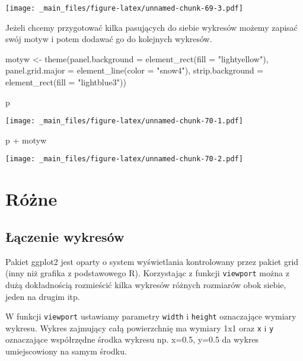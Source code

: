 \documentclass[
]{book}
\newenvironment{Shaded}{\begin{snugshade}}{\end{snugshade}}
\newcommand{\AttributeTok}[1]{\textcolor[rgb]{0.77,0.63,0.00}{#1}}
\newcommand{\FunctionTok}[1]{\textcolor[rgb]{0.00,0.00,0.00}{#1}}
\newcommand{\NormalTok}[1]{#1}
\newcommand{\OtherTok}[1]{\textcolor[rgb]{0.56,0.35,0.01}{#1}}
\newcommand{\SpecialCharTok}[1]{\textcolor[rgb]{0.00,0.00,0.00}{#1}}
\newcommand{\StringTok}[1]{\textcolor[rgb]{0.31,0.60,0.02}{#1}}
\begin{document}
\texttt{[image: \_main\_files/figure-latex/unnamed-chunk-69-3.pdf]}

Jeżeli chcemy przygotować kilka pasujących do siebie wykresów możemy zapisać swój motyw i potem dodawać go do kolejnych wykresów.

\begin{Shaded}
\begin{Highlighting}[]
\NormalTok{motyw }\OtherTok{\textless{}{-}} \FunctionTok{theme}\NormalTok{(}\AttributeTok{panel.background =} \FunctionTok{element\_rect}\NormalTok{(}\AttributeTok{fill =} \StringTok{"lightyellow"}\NormalTok{), }
               \AttributeTok{panel.grid.major =} \FunctionTok{element\_line}\NormalTok{(}\AttributeTok{color =} \StringTok{"snow4"}\NormalTok{),}
               \AttributeTok{strip.background =} \FunctionTok{element\_rect}\NormalTok{(}\AttributeTok{fill =} \StringTok{"lightblue3"}\NormalTok{))}

\NormalTok{p}
\end{Highlighting}
\end{Shaded}

\texttt{[image: \_main\_files/figure-latex/unnamed-chunk-70-1.pdf]}

\begin{Shaded}
\begin{Highlighting}[]
\NormalTok{p }\SpecialCharTok{+}\NormalTok{ motyw}
\end{Highlighting}
\end{Shaded}

\texttt{[image: \_main\_files/figure-latex/unnamed-chunk-70-2.pdf]}

\hypertarget{ruxf3ux17cne}{%
\section{Różne}\label{ruxf3ux17cne}}

\hypertarget{ux142ux105czenie-wykresuxf3w}{%
\subsection{Łączenie wykresów}\label{ux142ux105czenie-wykresuxf3w}}

Pakiet ggplot2 jest oparty o system wyświetlania kontrolowany przez pakiet grid (inny niż grafika z podstawowego R). Korzystając z funkcji \texttt{viewport} można z dużą dokładnością rozmieścić kilka wykresów różnych rozmiarów obok siebie, jeden na drugim itp.

W funkcji \texttt{viewport} ustawiamy parametry \texttt{width} i \texttt{height} oznaczające wymiary wykresu. Wykres zajmujący całą powierzchnię ma wymiary 1x1 oraz \texttt{x} i \texttt{y} oznaczające współrzędne środka wykresu np. x=0.5, y=0.5 da wykres umiejscowiony na samym środku.
\end{document}
